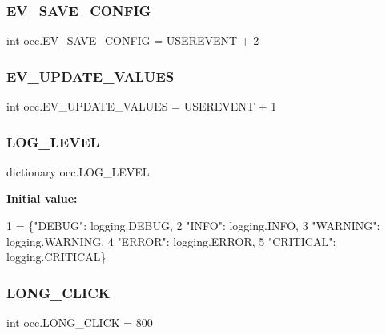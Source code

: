 \subsubsection{\texorpdfstring{E\+V\+\_\+\+S\+A\+V\+E\+\_\+\+C\+O\+N\+F\+IG}{EV\_SAVE\_CONFIG}}
{\footnotesize\ttfamily int occ.\+E\+V\+\_\+\+S\+A\+V\+E\+\_\+\+C\+O\+N\+F\+IG = U\+S\+E\+R\+E\+V\+E\+NT + 2}

\mbox{\label{namespaceocc_a5a9a4be409ee0999eda56f0ce148acf1}} 
\subsubsection{\texorpdfstring{E\+V\+\_\+\+U\+P\+D\+A\+T\+E\+\_\+\+V\+A\+L\+U\+ES}{EV\_UPDATE\_VALUES}}
{\footnotesize\ttfamily int occ.\+E\+V\+\_\+\+U\+P\+D\+A\+T\+E\+\_\+\+V\+A\+L\+U\+ES = U\+S\+E\+R\+E\+V\+E\+NT + 1}

\mbox{\label{namespaceocc_a46db66163eeb50234471c2f1f0bf4133}} 
\subsubsection{\texorpdfstring{L\+O\+G\+\_\+\+L\+E\+V\+EL}{LOG\_LEVEL}}
{\footnotesize\ttfamily dictionary occ.\+L\+O\+G\+\_\+\+L\+E\+V\+EL}

{\bfseries Initial value\+:}
\begin{DoxyCode}
1 =  \{\textcolor{stringliteral}{"DEBUG"}: logging.DEBUG,
2              \textcolor{stringliteral}{"INFO"}: logging.INFO,
3              \textcolor{stringliteral}{"WARNING"}: logging.WARNING,
4              \textcolor{stringliteral}{"ERROR"}: logging.ERROR,
5              \textcolor{stringliteral}{"CRITICAL"}: logging.CRITICAL\}
\end{DoxyCode}
\mbox{\label{namespaceocc_a7e1cbc3e940d1e1447f10aa267089947}} 
\subsubsection{\texorpdfstring{L\+O\+N\+G\+\_\+\+C\+L\+I\+CK}{LONG\_CLICK}}
{\footnotesize\ttfamily int occ.\+L\+O\+N\+G\+\_\+\+C\+L\+I\+CK = 800}

